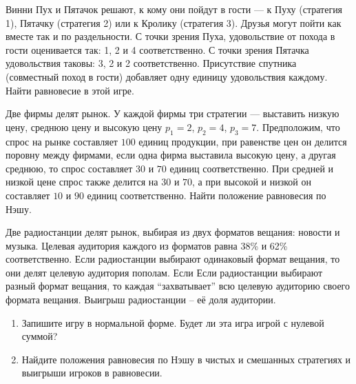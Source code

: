 \begin{exercise}
Винни Пух и Пятачок решают, к кому они пойдут в гости --- к Пуху
(стратегия 1), Пятачку (стратегия 2) или к Кролику (стратегия 3).
Друзья могут пойти как вместе так и по раздельности. С точки
зрения Пуха, удовольствие от похода в гости оценивается так: 1, 2
и 4 соответственно. С точки зрения Пятачка удовольствия таковы: 3,
2 и 2 соответственно. Присутствие спутника (совместный поход в
гости) добавляет одну единицу удовольствия каждому. Найти
равновесие в этой игре.
\end{exercise}

\begin{exercise}
Две фирмы делят рынок. У каждой фирмы три стратегии --- выставить
низкую цену, среднюю цену и высокую цену $p_1=2$, $p_2=4$,
$p_3=7$. Предположим, что спрос на рынке составляет $100$ единиц
продукции, при равенстве цен он делится поровну между фирмами,
если одна фирма выставила высокую цену, а другая среднюю, то спрос
составляет $30$ и $70$ единиц соответственно. При средней и низкой
цене спрос также делится на $30$ и $70$, а при высокой и низкой
он составляет $10$ и $90$ единиц соответственно. Найти положение
равновесия по Нэшу.
\end{exercise}

\begin{exercise}
Две радиостанции делят рынок, выбирая из двух форматов вещания: новости и музыка.
Целевая аудитория каждого из форматов равна 38\% и 62\% соответственно. Если радиостанции
выбирают одинаковый формат вещания, то они делят целевую аудитория пополам.
Если Если радиостанции выбирают разный формат вещания, то каждая ``захватывает''
всю целевую аудиторию своего формата вещания. Выигрыш радиостанции -- её доля аудитории.
\begin{enumerate}
	\item Запишите игру в нормальной форме. 
	Будет ли эта игра игрой с нулевой суммой? %
	\item Найдите положения равновесия по Нэшу в чистых и смешанных стратегиях
	и выигрыши игроков в равновесии.
\end{enumerate}
\end{exercise}



